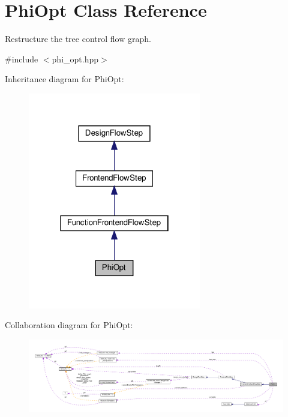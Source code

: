 \hypertarget{classPhiOpt}{}\section{Phi\+Opt Class Reference}
\label{classPhiOpt}


Restructure the tree control flow graph.  




{\ttfamily \#include $<$phi\+\_\+opt.\+hpp$>$}



Inheritance diagram for Phi\+Opt\+:
\nopagebreak
\begin{figure}[H]
\begin{center}
\leavevmode
\includegraphics[width=214pt]{de/d57/classPhiOpt__inherit__graph}
\end{center}
\end{figure}


Collaboration diagram for Phi\+Opt\+:
\nopagebreak
\begin{figure}[H]
\begin{center}
\leavevmode
\includegraphics[width=350pt]{dc/db7/classPhiOpt__coll__graph}
\end{center}
\end{figure}
